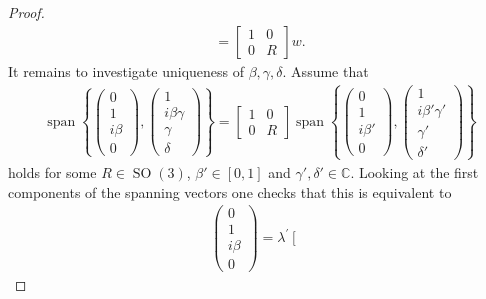 \documentclass{amsart}
\newcommand{\C}{\mathbb{C}}
\DeclareMathOperator{\SO}{SO}
\DeclareMathOperator{\spann}{span}
\begin{document}
\begin{proof}
\begin{align*}
        = 
        \left[\begin{array}{c|c}
            1& 0 \\
            \hline
            0 & R
            \end{array}\right] 
            w.
    \end{align*}
    It remains to investigate uniqueness of $\beta,\gamma,\delta$. 
    Assume that 
    \begin{align*}
        \spann \left\{
        \begin{pmatrix}
            0 \\ 1 \\ i \beta \\ 0
        \end{pmatrix},
        \begin{pmatrix}
            1 \\ i \beta \gamma \\ \gamma \\ \delta
        \end{pmatrix}
        \right\}
        =\left[\begin{array}{c|c}
            1& 0 \\
            \hline
            0 & R
            \end{array}\right]
        \spann \left\{
        \begin{pmatrix}
            0 \\ 1 \\ i \beta' \\ 0
        \end{pmatrix},
        \begin{pmatrix}
            1 \\ i \beta' \gamma' \\ \gamma' \\ \delta'
        \end{pmatrix}
        \right\}
    \end{align*}
    holds for some $R\in\SO(3)$, $\beta'\in[0,1]$ and $\gamma',\delta'\in \C$.
    Looking at the first components of the spanning vectors one checks that this is equivalent to 
    \begin{align*}
        \begin{pmatrix}
            0 \\ 1 \\ i \beta \\ 0
        \end{pmatrix}
        =\lambda^\prime
        \left[\begin{array}{c|c}

\end{array}
\end{align*}
\end{proof}
\end{document}
